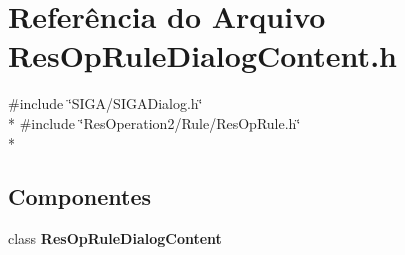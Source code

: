 \section{Referência do Arquivo Res\+Op\+Rule\+Dialog\+Content.\+h}
\label{_2_rule_2_res_op_rule_dialog_content_8h}
{\ttfamily \#include \char`\"{}S\+I\+G\+A/\+S\+I\+G\+A\+Dialog.\+h\char`\"{}}\\*
{\ttfamily \#include \char`\"{}Res\+Operation2/\+Rule/\+Res\+Op\+Rule.\+h\char`\"{}}\\*
\subsection*{Componentes}
\begin{DoxyCompactItemize}
\item 
class {\bf Res\+Op\+Rule\+Dialog\+Content}
\end{DoxyCompactItemize}
